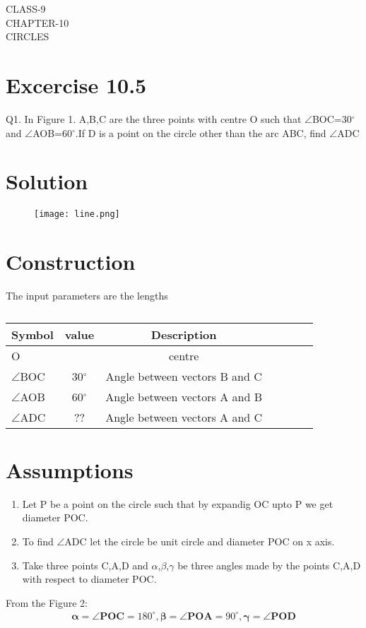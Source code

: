 \documentclass[12pt]{article}
\let\vec\mathbf
\begin{document}
\begin{center}
\textbf\large{CLASS-9\\CHAPTER-10 \\ CIRCLES}

\end{center}
\section*{Excercise 10.5}

Q1. In Figure 1. A,B,C are the three points with centre O such that $\angle$BOC=30$^\circ$ and $\angle$AOB=60$^\circ$.If D is a point on the circle other than the arc ABC, find $\angle$ADC
\section*{\large Solution}
\begin{figure}[h!]
\centering
\texttt{[image: line.png]}
\caption{}
\end{figure}
\section*{\large Construction}



The input parameters are the lengths



\begin{table}[htbp]
 \begin{center}
    \begin{tabular}{|l|c|c|c|c|c|c} \hline \textbf{Symbol}
  & \textbf{value} & \textbf{Description} \\
 \hline
O & & centre \\ \hline
$\angle$BOC &30$^\circ$ & Angle between vectors B and C  \\ \hline
$\angle$AOB&60$^\circ$&Angle between vectors A and B\\
	\hline
	$\angle$ADC&??&Angle between vectors A and C \\
	\hline
\end{tabular}   
\end{center}
\caption{\label{table:dummytable} }
\end{table}

\section*{\large Assumptions}
\begin{enumerate}
\item Let P be a point on the circle such that by expandig OC upto P we get diameter POC.
\item To find $\angle$ADC let the circle be unit circle and diameter POC on x axis.
\item Take three points C,A,D  and $\alpha$,$\beta$,$\gamma$ be three angles made by the points C,A,D with respect to diameter POC.
\end{enumerate}
From the Figure 2:
\begin{align}
\vec{\alpha} = \vec{\angle POC}= 180^\circ, 
\vec{\beta} = \vec{\angle POA} = 90^\circ,
\vec{\gamma} = \vec{\angle POD}
\end{align}
\end{document}
